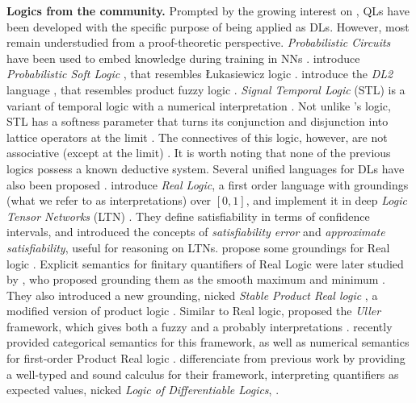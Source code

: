 \textbf{Logics from the \InAI{} community.} Prompted by the growing interest on \InAI{}, QLs have been developed with the specific purpose of being applied as DLs. However, most remain understudied from a proof-theoretic perspective. \emph{Probabilistic Circuits} have been used to embed knowledge during training in NNs \citep{lee2009advances, braun2025tractablerepresentationlearningprobabilistic}. \citeauthor{kimmig2012short} introduce \emph{Probabilistic Soft Logic} \citep{kimmig2012short}, that resembles  Łukasiewicz logic \cite{cintula2011handbook,prooffuzzy}. \citeauthor{fischer2019dl2} introduce the \emph{DL2} language \citep{fischer2019dl2}, that resembles product fuzzy logic \citep{cintula2011handbook, prooffuzzy}. \emph{Signal Temporal Logic} (STL) is a variant of temporal logic with a numerical interpretation \citep{varnai2020robustness}. Not unlike \citeauthor{capucci2024quantifiers}'s logic, STL has a softness parameter that turns its conjunction and disjunction into lattice operators at the limit \citep{varnai2020robustness}. The connectives of this logic, however, are not associative (except at the limit) \citep{affeldt2024taming}. It is worth noting that none of the previous logics possess a known deductive system. Several unified languages for DLs have also been proposed \citep{badreddine2022logic, van2024uller, slusarz2023logic}. \citeauthor{serafini2016logic} introduce \emph{Real Logic}, a first order language with groundings (what we refer to as interpretations) over $[0,1]$, and implement it in deep \emph{Logic Tensor Networks} (LTN) \cite{badreddine2022logic}.   
They define satisfiability in terms of confidence intervals, and introduced the concepts of \emph{satisfiability error} and \emph{approximate satisfiability}, useful for reasoning on LTNs.  \citeauthor{van2022analyzing} propose some groundings for Real logic \citep{van2022analyzing}. Explicit semantics for finitary quantifiers of Real Logic were later studied by \citeauthor{badreddine2022logic}, who proposed grounding them as the smooth maximum and minimum \citep{badreddine2022logic}. They also introduced a new grounding, nicked \emph{Stable Product Real logic} \citep{badreddine2022logic}, 
a modified version of product logic \citep{van2022analyzing}. Similar to Real logic, \citeauthor{van2024uller} proposed the \emph{Uller} framework, which gives both a fuzzy and a probably interpretations \citep{van2022analyzing}. \citeauthor{schellhorn2025muller} recently provided categorical semantics for this framework, as well as numerical semantics for first-order Product Real logic \citep{schellhorn2025muller}. \citeauthor{slusarz2023logic} differenciate from previous work by providing a well-typed and sound calculus for their framework, interpreting quantifiers as expected values, nicked \emph{Logic of Differentiable Logics},  \citep{slusarz2023logic}. 


